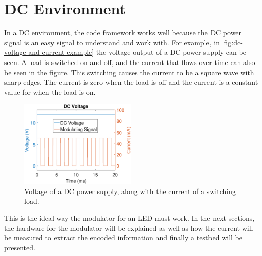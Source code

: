 
\section{DC Environment}
\label{sec:dc-environment}





In a DC environment, the code framework works well because the DC power signal is an easy signal to understand and work with.
For example, in \autoref{fig:dc-voltage-and-current-example} the voltage output of a DC power supply can be seen.
A load is switched on and off, and the current that flows over time can also be seen in the figure.
This switching causes the current to be a square wave with sharp edges.
The current is zero when the load is off and the current is a constant value for when the load is on.

\begin{figure}[ht]
  \centering
  \includegraphics[angle=0,width=0.5\textwidth]{chapters/hardware-chapters/DC/dc-voltage-and-current-example.eps}
  \caption{Voltage of a DC power supply, along with the current of a switching load.}
  \label{fig:dc-voltage-and-current-example}
\end{figure}



This is the ideal way the modulator for an LED must work.
In the next sections, the hardware for the modulator will be explained as well as how the current will be measured to extract the encoded information and finally a testbed will be presented. 










